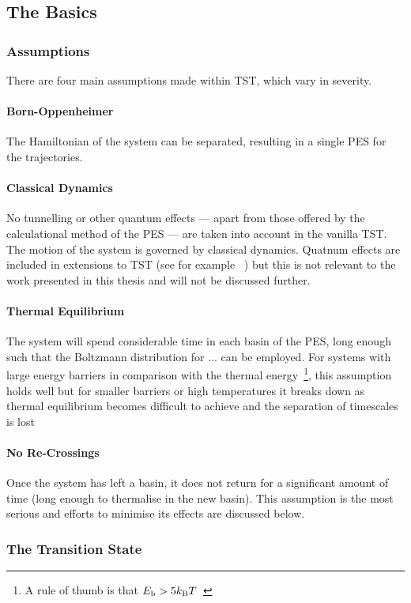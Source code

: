 \subsection{The Basics}

\subsubsection{Assumptions}
There are four main assumptions made within TST, which vary in severity.
\paragraph{Born-Oppenheimer}
The Hamiltonian of the system can be separated, resulting in a single PES for the trajectories.
\paragraph{Classical Dynamics}
No tunnelling or other quantum effects --- apart from those offered by the calculational method of the PES --- are taken into account in the vanilla TST.
The motion of the system is governed by classical dynamics.
Quatnum effects are included in extensions to TST (see for example \cite{qtst-hj-1997, qtst-hj-1998, qtst-hj-2009}~\citemiss) but this is not relevant to the work presented in this thesis and will not be discussed further.
\paragraph{Thermal Equilibrium}
The system will spend considerable time in each basin of the PES, long enough such that the Boltzmann distribution for ... can be employed.
For systems with large energy barriers in comparison with the thermal energy~\footnote{A rule of thumb is that $E_\text{b} > 5k_\text{B} T$~\citemiss}, this assumption holds well but for smaller barriers or high temperatures it breaks down as thermal equilibrium becomes difficult to achieve and the separation of timescales is lost
\paragraph{No Re-Crossings}
Once the system has left a basin, it does not return for a significant amount of time (long enough to thermalise in the new basin).
This assumption is the most serious and efforts to minimise its effects are discussed below.

\subsubsection{The Transition State}

